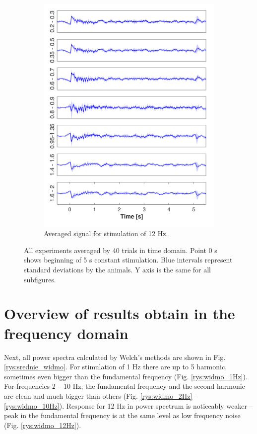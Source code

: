 \documentclass{pracalicmgr}
\begin{document}
\begin{figure}[H]
\begin{subfigure}{.5\textwidth}
	\includegraphics[width=1.\linewidth]{srednie_12Hz_5s.png}
	\caption{Averaged signal for stimulation of 12 Hz.}
	\label{rys:srednie_12Hz}
	\end{subfigure}
	\caption{All experiments averaged by 40 trials in time domain. Point 0 s shows beginning of 5 s constant stimulation. Blue intervals represent standard deviations by the animals. Y axis is the same for all subfigures.}
	\label{rys:srednia_czas}
		
	\end{figure}
	
    \section{Overview of results obtain in the frequency domain}
    
    Next, all power spectra calculated by Welch's methods are shown in Fig. \ref{rys:srednie_widmo}. For stimulation of 1 Hz there are up to 5 harmonic, sometimes even bigger than the fundamental frequency (Fig. \ref{rys:widmo_1Hz}). For frequencies 2 -- 10 Hz, the fundamental frequency and the second harmonic are clean and much bigger than others (Fig. \ref{rys:widmo_2Hz} -- \ref{rys:widmo_10Hz}). Response for 12 Hz in power spectrum is noticeably weaker -- peak in the fundamental frequency is at the same level as low frequency noise (Fig. \ref{rys:widmo_12Hz}).
    
\end{document}
